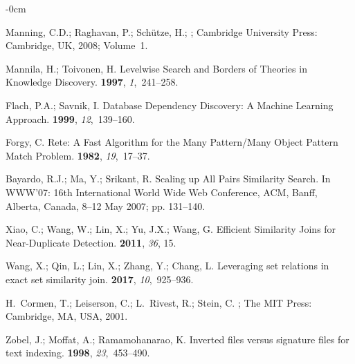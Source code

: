 \documentclass[algorithms,article,accept,pdftex,moreauthors]{Definitions/mdpi}
\begin{document}
\begin{adjustwidth}{-\extralength}{0cm}
\begin{thebibliography}{999}
Manning, C.D.; Raghavan, P.; Sch{\"u}tze, H.; %
; Cambridge
  University Press: Cambridge, UK, 2008; Volume~1.

Mannila, H.; Toivonen, H.
\newblock Levelwise Search and Borders of Theories in Knowledge Discovery.
 {\bf 1997}, {\em
  1},~241--258.

Flach, P.A.; Savnik, I.
\newblock Database Dependency Discovery: A Machine Learning Approach.
 {\bf 1999}, {\em 12},~139--160.

Forgy, C.
\newblock Rete: A Fast Algorithm for the Many Pattern/Many Object Pattern Match
  Problem.
 {\bf 1982}, {\em 19},~17--37.

Bayardo, R.J.; Ma, Y.; Srikant, R.
\newblock Scaling up All Pairs Similarity Search.
\newblock In WWW'07: 16th International World Wide Web Conference, ACM, Banff, Alberta, Canada, 8--12 May %
 2007; pp. 131–140.

Xiao, C.; Wang, W.; Lin, X.; Yu, J.X.; Wang, G.
\newblock Efficient Similarity Joins for Near-Duplicate Detection.
 {\bf 2011}, {\em 36}, 15.

Wang, X.; Qin, L.; Lin, X.; Zhang, Y.; Chang, L.
\newblock Leveraging set relations in exact set similarity join.
 {\bf 2017}, {\em
  10},~925--936.

H.~Cormen, T.; Leiserson, C.; L.~Rivest, R.; Stein, C.
; The MIT Press: Cambridge, MA, USA, %
 2001.

Zobel, J.; Moffat, A.; Ramamohanarao, K.
\newblock Inverted files versus signature files for text indexing.
 {\bf 1998}, {\em
  23},~453--490.


\end{thebibliography}
\end{adjustwidth}
\end{document}
